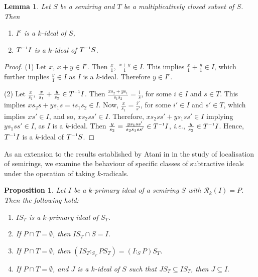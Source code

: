 \documentclass[11pt,english]{amsart}
\newcommand{\inv}{^{\raisebox{.2ex}{$\scriptscriptstyle-1$}}}
\newtheorem{proposition}[theorem]{Proposition}
\newtheorem{lemma}[theorem]{Lemma}
\theoremstyle{definition}
\numberwithin{equation}{section}
\begin{document}
\begin{lemma}\label{loc5}
    Let $S$ be a semiring and $T$ be a multiplicatively closed subset of $S$. Then 
    \begin{enumerate}
        \item $I^c$ is a $k$-ideal of $S$,
        \item  $T\inv I$ is a $k$-ideal of $T\inv S$.
    \end{enumerate}
    
\end{lemma}

\begin{proof}
    (1) Let $x$, $x+y \in I^c$. Then $\frac{x}{1},\ \frac{x+y}{1} \in I$. This implies $\frac{x}{1}+\frac{y}{1}\in I$, which further implies $\frac{y}{1} \in I$ as $I$ is a $k$-ideal. Therefore $y\in I^c$.
    
    (2) Let $\frac{x}{s_1}$, $\frac{x}{s_1}+\frac{y}{s_2} \in T\inv I$. Then $\frac{xs_2+ys_1}{s_1s_2}=\frac{i}{s}$, for some $i\in I$ and $s\in T$. This implies $xs_2s+ys_1s=is_1s_2\in I$. Now, $\frac{x}{s_1}=\frac{i'}{s'}$, for some $i'\in I$ and $s'\in T$, which implies $xs'\in I$, and so, $xs_2ss'\in I$. Therefore, $xs_2ss'+ys_1ss'\in I$ implying $ys_1ss'\in I$, as $I$ is a $k$-ideal. Then $\frac{y}{s_2}=\frac{ys_1ss'}{s_2s_1ss'}\in T\inv I$, \textit{i.e.},  $\frac{y}{s_2} \in T\inv I$. Hence, $T\inv I$ is a $k$-ideal of $T\inv S$.
\end{proof}

As an extension to the results established by Atani in \cite[Lemma 9]{Atani08} in the study of localisation of semirings, we examine the behaviour of specific classes of subtractive ideals under the operation of taking $k$-radicals. 

\begin{proposition}\label{loc6}
Let $I$ be a $k$-primary ideal of a semiring $S$ with $\mathcal{R}_k(I) = P$. Then the following hold:
\begin{enumerate}
	
\item $IS_T$ is a $k$-primary ideal of $S_T$.

\item If $P \cap T = \emptyset$, then $IS_T \cap S = I$.

\item  If $P \cap T = \emptyset$, then $(IS_T :_{S_T} PS_T)=(I :_S P)S_T$.

\item If $P \cap T = \emptyset$, and $J$ is a $k$-ideal of $S$ such that $JS_T\subseteq IS_T$, then $J \subseteq  I.$
\end{enumerate}
\end{proposition}
\end{document}
